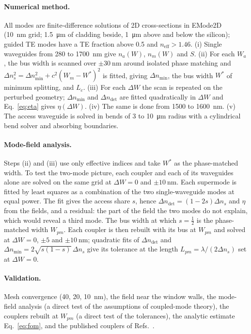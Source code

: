\documentclass[11pt,a4paper]{article}
\newcommand{\dn}{\Delta n}
\begin{document}
\paragraph{Numerical method.}
All modes are finite-difference solutions of 2D cross-sections in EMode2D~\citep{emode}
(\qty{10}{\nm} grid; \qty{1.5}{\um} of cladding beside, \qty{1}{\um} above and below the
silicon); guided TE modes have a TE fraction above 0.5 and $n_\mathrm{eff} > 1.46$. (i) Single waveguides from 280 to \qty{1700}{\nm} give $n_a(W)$, $n_m(W)$ and $S$.
(ii) For each $W_a$, the bus width is scanned over $\pm\qty{30}{\nm}$ around isolated phase
matching and $\dn_s^2 = \dn_\mathrm{min}^2 + c^2 (W_m - W^*)^2$ is fitted, giving
$\dn_\mathrm{min}$, the bus width $W^*$ of minimum splitting, and $L_c$. (iii) For each
$\Delta W$ the scan is repeated on the perturbed geometry; $\dn_\mathrm{min}$ and
$\dn_\mathrm{det}$ are fitted quadratically in $\Delta W$ and Eq.~\eqref{eq:eta} gives
$\eta(\Delta W)$. (iv) The same is done from 1500 to \qty{1600}{\nm}. (v) The access
waveguide is solved in bends of 3 to \qty{10}{\um} radius with a cylindrical bend solver
and absorbing boundaries.

\paragraph{Mode-field analysis.}
Steps (ii) and (iii) use only effective indices and take $W^*$ as the phase-matched
width. To test the two-mode picture, each coupler and each of its waveguides alone are
solved on the same grid at $\Delta W = 0$ and $\pm\qty{10}{\nm}$. Each supermode is fitted
by least squares as a combination of the two single-waveguide modes at equal power. The
fit gives the access share $s$, hence $\dn_\mathrm{det} = (1-2s)\dn_s$ and $\eta$ from the
fields, and a residual: the part of the field the two modes do not explain, which would
reveal a third mode. The bus width at which $s = \tfrac12$ is the phase-matched width
$W_{pm}$. Each coupler is then rebuilt with its bus at $W_{pm}$ and solved at
$\Delta W = 0$, $\pm5$ and $\pm\qty{10}{\nm}$; quadratic fits of $\dn_\mathrm{det}$ and
$\dn_\mathrm{min} = 2\sqrt{s(1-s)}\,\dn_s$ give its tolerance at the length
$L_{pm} = \lambda/(2\dn_s)$ set at $\Delta W = 0$.

\paragraph{Validation.}
Mesh convergence (40, 20, \qty{10}{\nm}), the field near the window walls, the
mode-field analysis (a direct test of the assumptions of coupled-mode theory), the
couplers rebuilt at $W_{pm}$ (a direct test of the tolerances), the analytic
estimate Eq.~\eqref{eq:fom}, and the published couplers of
Refs.~\citep{wang2022corrugated,dai2013mode}.
\end{document}
